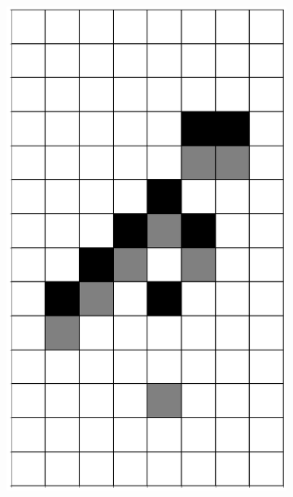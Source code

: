 \documentclass[12pt]{article}
\numberwithin{figure}{section} %
\begin{document}
\begin{figure}[H]
\begin{subfigure}{0.18\textwidth}
    		\includegraphics[width=\linewidth]{Section4/17.2}
     		\subcaption{}
   	\end{subfigure}
        	\begin{subfigure}{0.18\textwidth}
     		\centering

\end{subfigure}
\end{figure}
\end{document}
